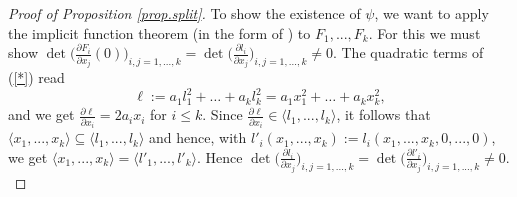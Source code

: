 \documentclass[11pt]{article}
\begin{document}
\begin{proof}[Proof of Proposition \ref{prop.split}]
  To show the existence of $\psi$, 
  we want to apply the  implicit function theorem (in the form of \cite[Theorem 1.1]{GP25}) to $F_1,...,F_{k}$. For this we must show $\det \big ( \frac{\partial F_i}{\partial x_j} (0)\big )_{i,j = 1,...,k} 
  =\det \big ( \frac{\partial l_i}{\partial x_j}\big )_{i,j = 1,...,k} \ne 0$. 
The quadratic terms of (\ref{*}) read
$$\ell:= a_1 l_1^2+\ldots+a_kl_{k}^2   =  a_1x_1^2+\ldots+a_kx_k^2,$$
 and  we get $\frac{\partial \ell}{\partial x_i} = 2a_ix_{i}$  for $i \le k$. 
  Since $\frac{\partial \ell}{\partial x_i} \in \langle l_{1} ,...,l_{k}\rangle$,
  it follows that $\langle x_{1} ,...,x_{k}\rangle \subseteq \langle l_{1} ,...,l_{k}\rangle$ and hence, with $l'_i(x_1,...,x_{k}) 
  := l_i (x_{1} ,...,x_{k},0,...,0)$, 
  we get $\langle x_{1} ,...,x_{k}\rangle = \langle l'_{1} ,...,l'_{k}\rangle$. Hence $\det \big ( \frac{\partial l_i}{\partial x_j}\big )_{i,j = 1,...,k} = \det \big ( \frac{\partial l'_i}{\partial x_j}\big )_{i,j = 1,...,k} \ne 0$.\\
  

\end{proof}
\end{document}
